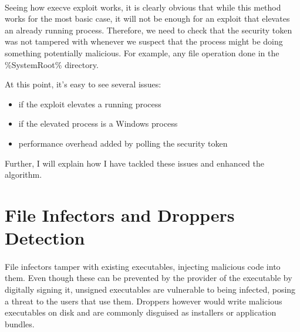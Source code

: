         \paragraph{}
        Seeing how execve exploit works, it is clearly obvious that while this method works for the most basic case, it will not be enough for an
        exploit that elevates an already running process. Therefore, we need to check that the security token was not tampered with whenever we
        suspect that the process might be doing something potentially malicious. For example, any file operation done in the \%SystemRoot\% directory.

        At this point, it's easy to see several issues:\\

        \begin{itemize}
            \item if the exploit elevates a running process
            \item if the elevated process is a Windows process
            \item performance overhead added by polling the security token
        \end{itemize}

        Further, I will explain how I have tackled these issues and enhanced the algorithm.

        \paragraph{}
        



    \section{File Infectors and Droppers Detection}
        \paragraph{}
        File infectors tamper with existing executables, injecting malicious code into them. Even though these can be prevented by the provider
        of the executable by digitally signing it, unsigned executables are vulnerable to being infected, posing a threat to the users that
        use them. Droppers however would write malicious executables on disk and are commonly disguised as installers or application bundles.

